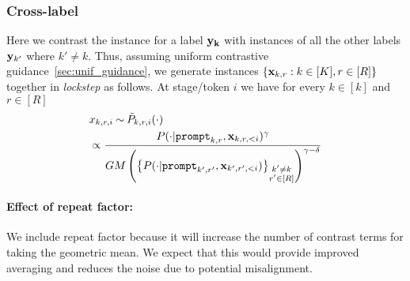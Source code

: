  \subsubsection{Cross-label \corrsyn{}}
Here we contrast the instance for a label $\mathbf{y_k}$ with instances of all the other labels $\mathbf{y}_{k'}$ where $k'\neq k$. Thus, assuming uniform contrastive guidance~\ref{sec:unif_guidance}, we generate instances $\{\mathbf{x}_{k,r}:k\in[K], r\in[R]\}$ together in \textit{lockstep} as follows. At stage/token $i$ we have for every $k\in[k]$ and $r\in [R]$
 \begin{align}
 \begin{aligned}
      & x_{k,r,i}\mathbin{\overset{}{\kern0pt\sim}} \tilde {P}_{k,r,i}(\cdot) \\
      &\propto \frac{P(\cdot| \mathtt{prompt}_{k,r},\mathbf{x}_{k,r,<i})^{\gamma}}{GM\left(\left\{P(\cdot| \mathtt{prompt}_{k',r'},\mathbf{x}_{k',r',<i})\right\}_{\substack {k'\neq k\\ r'\in[R]}}\right)^{\gamma-\delta}}\label{eq:K-Corr-cross-1}
 \end{aligned}
 \end{align}
 \paragraph{Effect of repeat factor:} We include repeat factor because it will increase the number of contrast terms for taking the geometric mean. We expect that this would provide improved averaging and reduces the noise due to potential misalignment.%


